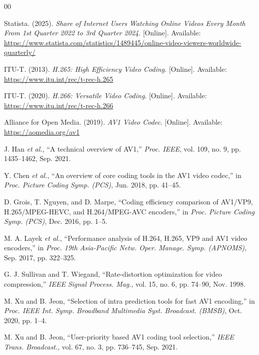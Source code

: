 \documentclass[conference]{IEEEtran}
\begin{document}
\begin{thebibliography}{00}

 Statista. (2025). \emph{Share of Internet Users Watching Online Videos Every Month From 1st Quarter 2022 to 3rd Quarter 2024}. [Online]. Available: \url{https://www.statista.com/statistics/1489445/online-video-viewers-worldwide-quarterly/}

 ITU-T. (2013). \emph{H.265: High Efficiency Video Coding}. [Online]. Available: \url{https://www.itu.int/rec/t-rec-h.265}

 ITU-T. (2020). \emph{H.266: Versatile Video Coding}. [Online]. Available: \url{https://www.itu.int/rec/t-rec-h.266}

 Alliance for Open Media. (2019). \emph{AV1 Video Codec}. [Online]. Available: \url{https://aomedia.org/av1}

 J. Han \emph{et al.}, ``A technical overview of AV1,'' \emph{Proc. IEEE}, vol. 109, no. 9, pp. 1435--1462, Sep. 2021.

 Y. Chen \emph{et al.}, ``An overview of core coding tools in the AV1 video codec,'' in \emph{Proc. Picture Coding Symp. (PCS)}, Jun. 2018, pp. 41--45.

 D. Grois, T. Nguyen, and D. Marpe, ``Coding efficiency comparison of AV1/VP9, H.265/MPEG-HEVC, and H.264/MPEG-AVC encoders,'' in \emph{Proc. Picture Coding Symp. (PCS)}, Dec. 2016, pp. 1--5.

 M. A. Layek \emph{et al.}, ``Performance analysis of H.264, H.265, VP9 and AV1 video encoders,'' in \emph{Proc. 19th Asia-Pacific Netw. Oper. Manage. Symp. (APNOMS)}, Sep. 2017, pp. 322--325.

 G. J. Sullivan and T. Wiegand, ``Rate-distortion optimization for video compression,'' \emph{IEEE Signal Process. Mag.}, vol. 15, no. 6, pp. 74--90, Nov. 1998.

 M. Xu and B. Jeon, ``Selection of intra prediction tools for fast AV1 encoding,'' in \emph{Proc. IEEE Int. Symp. Broadband Multimedia Syst. Broadcast. (BMSB)}, Oct. 2020, pp. 1--4.

 M. Xu and B. Jeon, ``User-priority based AV1 coding tool selection,'' \emph{IEEE Trans. Broadcast.}, vol. 67, no. 3, pp. 736--745, Sep. 2021.


\end{thebibliography}
\end{document}
